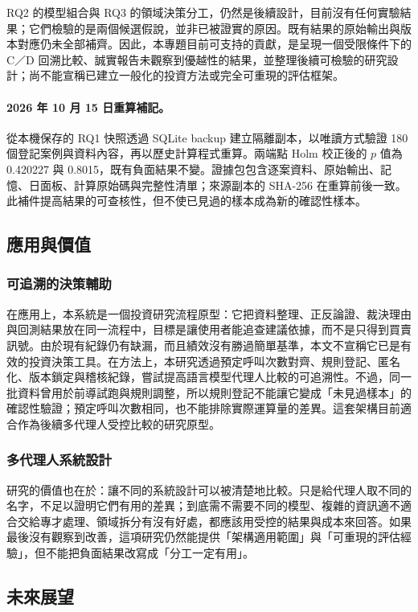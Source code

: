 RQ2 的模型組合與 RQ3 的領域決策分工，仍然是後續設計，目前沒有任何實驗結果；它們檢驗的是兩個候選假說，並非已被證實的原因。既有結果的原始輸出與版本對應仍未全部補齊。因此，本專題目前可支持的貢獻，是呈現一個受限條件下的 C／D 回溯比較、誠實報告未觀察到優越性的結果，並整理後續可檢驗的研究設計；尚不能宣稱已建立一般化的投資方法或完全可重現的評估框架。

\paragraph{2026 年 10 月 15 日重算補記。} 從本機保存的 RQ1 快照透過 SQLite backup 建立隔離副本，以唯讀方式驗證 180 個登記案例與資料內容，再以歷史計算程式重算。兩端點 Holm 校正後的 $p$ 值為 0.420227 與 0.8015，既有負面結果不變。證據包包含逐案資料、原始輸出、記憶、日面板、計算原始碼與完整性清單；來源副本的 SHA-256 在重算前後一致。此補件提高結果的可查核性，但不使已見過的樣本成為新的確認性樣本。

\subsection{應用與價值}

\subsubsection{可追溯的決策輔助}
在應用上，本系統是一個投資研究流程原型：它把資料整理、正反論證、裁決理由與回測結果放在同一流程中，目標是讓使用者能追查建議依據，而不是只得到買賣訊號。由於現有紀錄仍有缺漏，而且績效沒有勝過簡單基準，本文不宣稱它已是有效的投資決策工具。在方法上，本研究透過預定呼叫次數對齊、規則登記、匿名化、版本鎖定與稽核紀錄，嘗試提高語言模型代理人比較的可追溯性。不過，同一批資料曾用於前導試跑與規則調整，所以規則登記不能讓它變成「未見過樣本」的確認性驗證；預定呼叫次數相同，也不能排除實際運算量的差異。這套架構目前適合作為後續多代理人受控比較的研究原型。
\subsubsection{多代理人系統設計}

研究的價值也在於：讓不同的系統設計可以被清楚地比較。只是給代理人取不同的名字，不足以證明它們有用的差異；到底需不需要不同的模型、複雜的資訊適不適合交給專才處理、領域拆分有沒有好處，都應該用受控的結果與成本來回答。如果最後沒有觀察到改善，這項研究仍然能提供「架構適用範圍」與「可重現的評估經驗」，但不能把負面結果改寫成「分工一定有用」。

\subsection{未來展望}

